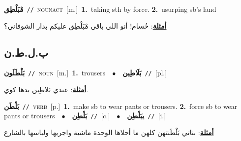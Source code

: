 \documentclass[10pt,a4paper,twoside]{article} %
\begin{document}
\begin{multicols}{2}
{\setlength\topsep{0pt}\textbf{\foreignlanguage{arabic}{مْبَلْطِق}}\ {\color{gray}\texttt{//}\color{black}}\ \textsc{noun\textunderscore act}\ [m.]\ \textbf{1.}~taking sth by force.  \textbf{2.}~usurping sb's land\  \begin{flushright}\color{gray}\foreignlanguage{arabic}{\textbf{\underline{\foreignlanguage{arabic}{أمثلة}}}: حُسام! أنو اللي باقي مْبَلْطِق عليكم بدار الشوفاني؟}\end{flushright}\color{black}} \vspace{2mm}

\vspace{-3mm}
\subsection*{\color{blue}\foreignlanguage{arabic}{ب.ل.ط.ن}\color{blue}{}} 

{\setlength\topsep{0pt}\textbf{\foreignlanguage{arabic}{بَلْطَلَون}}\ {\color{gray}\texttt{//}\color{black}}\ \textsc{noun}\ [m.]\ \textbf{1.}~trousers\ \ $\bullet$\ \ \setlength\topsep{0pt}\textbf{\foreignlanguage{arabic}{بَلَاطِين}}\ {\color{gray}\texttt{//}\color{black}}\ [pl.]\  \begin{flushright}\color{gray}\foreignlanguage{arabic}{\textbf{\underline{\foreignlanguage{arabic}{أمثلة}}}: عندي بَلاطِين بدها كوي.}\end{flushright}\color{black}} \vspace{2mm}

{\setlength\topsep{0pt}\textbf{\foreignlanguage{arabic}{بَلْطَن}}\ {\color{gray}\texttt{//}\color{black}}\ \textsc{verb}\ [p.]\ \textbf{1.}~make sb to wear pants or trousers.  \textbf{2.}~force sb to wear pants or trousers\ \ $\bullet$\ \ \setlength\topsep{0pt}\textbf{\foreignlanguage{arabic}{بَلْطِن}}\ {\color{gray}\texttt{//}\color{black}}\ [c.]\ \ $\bullet$\ \ \setlength\topsep{0pt}\textbf{\foreignlanguage{arabic}{يبَلْطِن}}\ {\color{gray}\texttt{//}\color{black}}\ [i.]\  \begin{flushright}\color{gray}\foreignlanguage{arabic}{\textbf{\underline{\foreignlanguage{arabic}{أمثلة}}}: بناتي بَلْطَنتهن كلهن ما أحلاها الوحدة ماشية واجريها ولباسها بالشارع}\end{flushright}\color{black}} \vspace{2mm}


\end{multicols}
\end{document}
